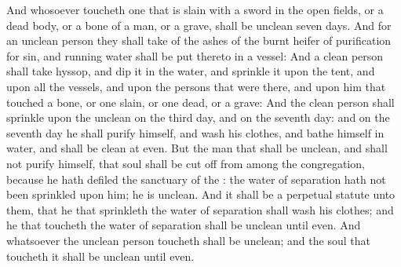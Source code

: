 \begin{biblechapter}
\verse And whosoever toucheth one that is slain with a sword in the open fields, or a dead body, or a bone of a man, or a grave, shall be unclean seven days.
\verse And for an unclean person they shall take of the ashes of the burnt heifer of purification for sin, and running water shall be put thereto in a vessel:
\verse And a clean person shall take hyssop, and dip it in the water, and sprinkle it upon the tent, and upon all the vessels, and upon the persons that were there, and upon him that touched a bone, or one slain, or one dead, or a grave:
\verse And the clean person shall sprinkle upon the unclean on the third day, and on the seventh day: and on the seventh day he shall purify himself, and wash his clothes, and bathe himself in water, and shall be clean at even.
\verse But the man that shall be unclean, and shall not purify himself, that soul shall be cut off from among the congregation, because he hath defiled the sanctuary of the \LORD: the water of separation hath not been sprinkled upon him; he is unclean.
\verse And it shall be a perpetual statute unto them, that he that sprinkleth the water of separation shall wash his clothes; and he that toucheth the water of separation shall be unclean until even.
\verse And whatsoever the unclean person toucheth shall be unclean; and the soul that toucheth it shall be unclean until even.
\end{biblechapter}

